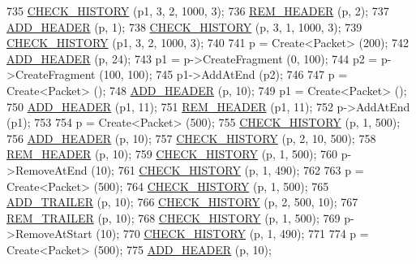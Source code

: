 \begin{DoxyCode}
735   \hyperlink{packet-metadata-test_8cc_a15a730e778d9d498a39e778bcd39684c}{CHECK\_HISTORY} (p1, 3, 2, 1000, 3);
736   \hyperlink{packet-metadata-test_8cc_a8694c61c9ba33c72896dde3628538a84}{REM\_HEADER} (p, 2);
737   \hyperlink{packet-metadata-test_8cc_a120012d48d29d678b3138d5c7b9bf714}{ADD\_HEADER} (p, 1);
738   \hyperlink{packet-metadata-test_8cc_a15a730e778d9d498a39e778bcd39684c}{CHECK\_HISTORY} (p, 3, 1, 1000, 3);
739   \hyperlink{packet-metadata-test_8cc_a15a730e778d9d498a39e778bcd39684c}{CHECK\_HISTORY} (p1, 3, 2, 1000, 3);
740 
741   p = Create<Packet> (200);
742   \hyperlink{packet-metadata-test_8cc_a120012d48d29d678b3138d5c7b9bf714}{ADD\_HEADER} (p, 24);
743   p1 = p->CreateFragment (0, 100);
744   p2 = p->CreateFragment (100, 100);
745   p1->AddAtEnd (p2);
746 
747   p = Create<Packet> ();
748   \hyperlink{packet-metadata-test_8cc_a120012d48d29d678b3138d5c7b9bf714}{ADD\_HEADER} (p, 10);
749   p1 = Create<Packet> ();
750   \hyperlink{packet-metadata-test_8cc_a120012d48d29d678b3138d5c7b9bf714}{ADD\_HEADER} (p1, 11);
751   \hyperlink{packet-metadata-test_8cc_a8694c61c9ba33c72896dde3628538a84}{REM\_HEADER} (p1, 11);
752   p->AddAtEnd (p1);
753 
754   p = Create<Packet> (500);
755   \hyperlink{packet-metadata-test_8cc_a15a730e778d9d498a39e778bcd39684c}{CHECK\_HISTORY} (p, 1, 500);
756   \hyperlink{packet-metadata-test_8cc_a120012d48d29d678b3138d5c7b9bf714}{ADD\_HEADER} (p, 10);
757   \hyperlink{packet-metadata-test_8cc_a15a730e778d9d498a39e778bcd39684c}{CHECK\_HISTORY} (p, 2, 10, 500);
758   \hyperlink{packet-metadata-test_8cc_a8694c61c9ba33c72896dde3628538a84}{REM\_HEADER} (p, 10);
759   \hyperlink{packet-metadata-test_8cc_a15a730e778d9d498a39e778bcd39684c}{CHECK\_HISTORY} (p, 1, 500);
760   p->RemoveAtEnd (10);
761   \hyperlink{packet-metadata-test_8cc_a15a730e778d9d498a39e778bcd39684c}{CHECK\_HISTORY} (p, 1, 490);
762 
763   p = Create<Packet> (500);
764   \hyperlink{packet-metadata-test_8cc_a15a730e778d9d498a39e778bcd39684c}{CHECK\_HISTORY} (p, 1, 500);
765   \hyperlink{packet-metadata-test_8cc_ab10bc130bb7184d47509ea44f4fb24df}{ADD\_TRAILER} (p, 10);
766   \hyperlink{packet-metadata-test_8cc_a15a730e778d9d498a39e778bcd39684c}{CHECK\_HISTORY} (p, 2, 500, 10);
767   \hyperlink{packet-metadata-test_8cc_a1e12d07d4d7c9ab1695230cdf925b4d6}{REM\_TRAILER} (p, 10);
768   \hyperlink{packet-metadata-test_8cc_a15a730e778d9d498a39e778bcd39684c}{CHECK\_HISTORY} (p, 1, 500);
769   p->RemoveAtStart (10);
770   \hyperlink{packet-metadata-test_8cc_a15a730e778d9d498a39e778bcd39684c}{CHECK\_HISTORY} (p, 1, 490);
771 
774   p = Create<Packet> (500);
775   \hyperlink{packet-metadata-test_8cc_a120012d48d29d678b3138d5c7b9bf714}{ADD\_HEADER} (p, 10);

\end{DoxyCode}
